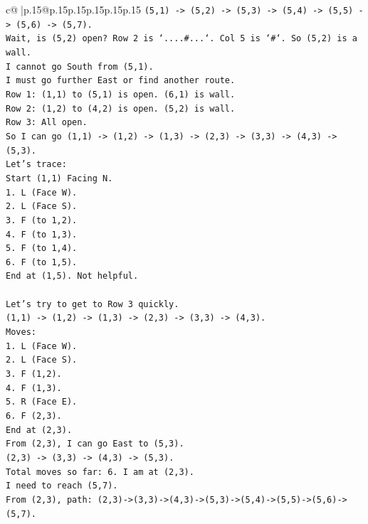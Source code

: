 \documentclass{article}
\begin{document}
{\begin{supertabular}{c@{$\;$}|p{.15\linewidth}@{}p{.15\linewidth}p{.15\linewidth}p{.15\linewidth}p{.15\linewidth}p{.15\linewidth}}
{{{\texttt{(5,1) {-}> (5,2) {-}> (5,3) {-}> (5,4) {-}> (5,5) {-}> (5,6) {-}> (5,7).} \\
\texttt{Wait, is (5,2) open? Row 2 is `....\#...`. Col 5 is `\#`. So (5,2) is a wall.} \\
\texttt{I cannot go South from (5,1).} \\
\texttt{I must go further East or find another route.} \\
\texttt{Row 1: (1,1) to (5,1) is open. (6,1) is wall.} \\
\texttt{Row 2: (1,2) to (4,2) is open. (5,2) is wall.} \\
\texttt{Row 3: All open.} \\
\texttt{So I can go (1,1) {-}> (1,2) {-}> (1,3) {-}> (2,3) {-}> (3,3) {-}> (4,3) {-}> (5,3).} \\
\texttt{Let's trace:} \\
\texttt{Start (1,1) Facing N.} \\
\texttt{1. L (Face W).} \\
\texttt{2. L (Face S).} \\
\texttt{3. F (to 1,2).} \\
\texttt{4. F (to 1,3).} \\
\texttt{5. F (to 1,4).} \\
\texttt{6. F (to 1,5).} \\
\texttt{End at (1,5). Not helpful.} \\
\\ 
\texttt{Let's try to get to Row 3 quickly.} \\
\texttt{(1,1) {-}> (1,2) {-}> (1,3) {-}> (2,3) {-}> (3,3) {-}> (4,3).} \\
\texttt{Moves:} \\
\texttt{1. L (Face W).} \\
\texttt{2. L (Face S).} \\
\texttt{3. F (1,2).} \\
\texttt{4. F (1,3).} \\
\texttt{5. R (Face E).} \\
\texttt{6. F (2,3).} \\
\texttt{End at (2,3).} \\
\texttt{From (2,3), I can go East to (5,3).} \\
\texttt{(2,3) {-}> (3,3) {-}> (4,3) {-}> (5,3).} \\
\texttt{Total moves so far: 6. I am at (2,3).} \\
\texttt{I need to reach (5,7).} \\
\texttt{From (2,3), path: (2,3){-}>(3,3){-}>(4,3){-}>(5,3){-}>(5,4){-}>(5,5){-}>(5,6){-}>(5,7).} \\
}}}
\end{supertabular}}
\end{document}
